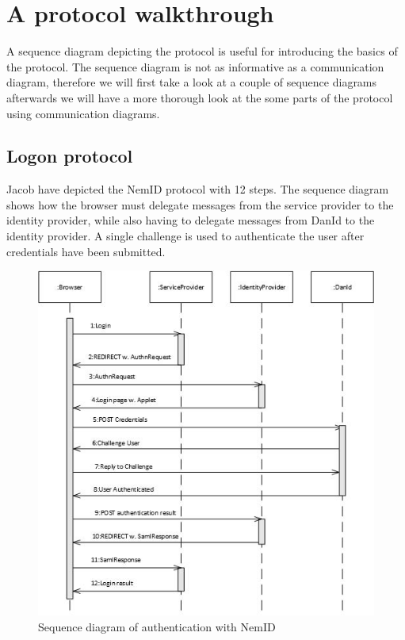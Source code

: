 \documentclass[twosided]{report}
\begin{document}
\section{A protocol walkthrough}
A sequence diagram depicting the protocol is useful for introducing the basics of the protocol. The sequence diagram is not as informative as a communication diagram, therefore we will first take a look at a couple of sequence diagrams afterwards we will have a more thorough look at the some parts of the protocol using communication diagrams.

\subsection{Logon protocol}
Jacob have depicted the NemID protocol with 12 steps. The sequence diagram shows how the browser must delegate messages from the service provider to the identity provider, while also having to delegate messages from DanId to the identity provider. A single challenge is used to authenticate the user after credentials have been submitted.

\begin{figure}[H]
	\centering
	\includegraphics{images/Sequence-login-Jacob.jpg}
	\caption{Sequence diagram of authentication with NemID \cite{jacob}}
\end{figure}
\end{document}
